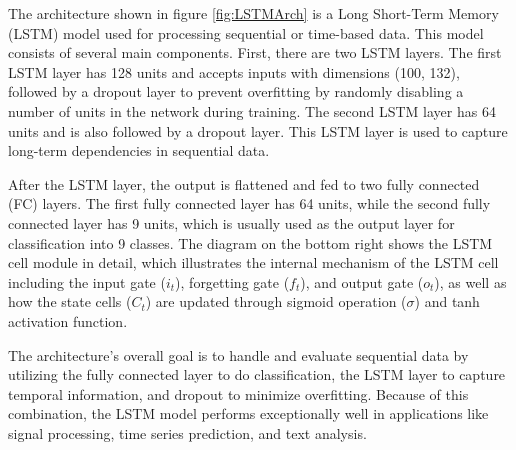 The architecture shown in figure \ref{fig:LSTMArch} is a Long Short-Term Memory (LSTM) model used for processing sequential or time-based data. This model consists of several main components. First, there are two LSTM layers. The first LSTM layer has 128 units and accepts inputs with dimensions (100, 132), followed by a dropout layer to prevent overfitting by randomly disabling a number of units in the network during training. The second LSTM layer has 64 units and is also followed by a dropout layer. This LSTM layer is used to capture long-term dependencies in sequential data.

After the LSTM layer, the output is flattened and fed to two fully connected (FC) layers. The first fully connected layer has 64 units, while the second fully connected layer has 9 units, which is usually used as the output layer for classification into 9 classes. The diagram on the bottom right shows the LSTM cell module in detail, which illustrates the internal mechanism of the LSTM cell including the input gate (\(i_t\)), forgetting gate (\(f_t\)), and output gate (\(o_t\)), as well as how the state cells (\(C_t\)) are updated through sigmoid operation (\(\sigma\)) and tanh activation function.

The architecture's overall goal is to handle and evaluate sequential data by utilizing the fully connected layer to do classification, the LSTM layer to capture temporal information, and dropout to minimize overfitting. Because of this combination, the LSTM model performs exceptionally well in applications like signal processing, time series prediction, and text analysis.


